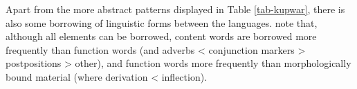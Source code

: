 \documentclass[output=paper,
modfonts
]{langscibook}
\begin{document}





Apart from the more abstract patterns displayed in Table \ref{tab-kupwar}, there is also some borrowing of linguistic forms between the languages. \textcite{gumperzetal1971convergence} note that, although all elements can be borrowed, content words are borrowed more frequently than function words (and adverbs < conjunction markers > postpositions > other), and function words more frequently than morphologically bound material (where derivation < inflection).
\end{document}
